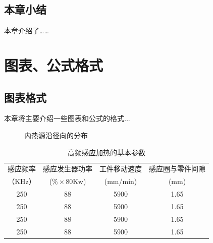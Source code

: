 \documentclass[UTF8,a4paper,12pt]{ctexart}
\numberwithin{equation}{section}
\begin{document}
\subsection{本章小结}
本章介绍了……

\newpage
{}

\section{图表、公式格式}
\subsection{图表格式}
本章将主要介绍一些图表和公式的格式...\\

\begin{figure}[htb] 
\caption{内热源沿径向的分布}
\end{figure} %

\begin{table}[htbp]
\centering
\caption{高频感应加热的基本参数}
\small
\begin{tabular}{c c c c}
\toprule
感应频率 &感应发生器功率 & 工件移动速度  &感应圈与零件间隙\\
（KHz）&($\% \times$80Kw) &(mm/min)  &(mm)\\
\midrule
250 &88 &5900 &1.65\\

250 &88 &5900 &1.65\\

250 &88 &5900 &1.65\\

250 &88 &5900 &1.65\\



\bottomrule
\end{tabular}
\end{table}
\end{document}
